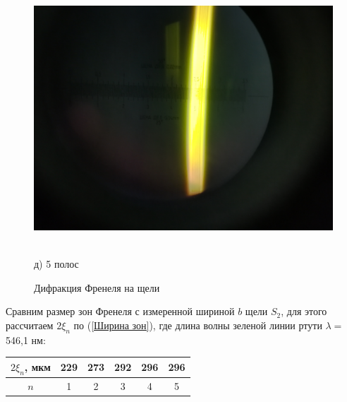\documentclass[a4paper, 12pt]{article}
\begin{document}
\begin{enumerate}
\begin{figure}[h!]
\begin{center}
\begin{minipage}{0.5\textwidth}
	\includegraphics[width=1\textwidth]{frenel-5.jpg}
	\begin{center}
	\\ д) 5 полос
	\end{center}
\end{minipage}
\end{center}
\caption{Дифракция Френеля на щели}
\end{figure}

\newpage
	Сравним размер зон Френеля с измеренной шириной $b$ щели $S_2$, для этого рассчитаем $2 \xi_n$ по (\ref{Ширина зон}), где длина волны зеленой линии ртути $\lambda = $ 546,1 нм:

	\begin{center}
		\begin{tabular}{|c|c|c|c|c|c|}
			\hline
			$2\xi_n$, мкм & 229 & 273 & 292 & 296 & 296 \\ \hline
			$n$           & 1   & 2   & 3   & 4   & 5   \\ \hline
		\end{tabular}
	\end{center}


\end{enumerate}
\end{document}

